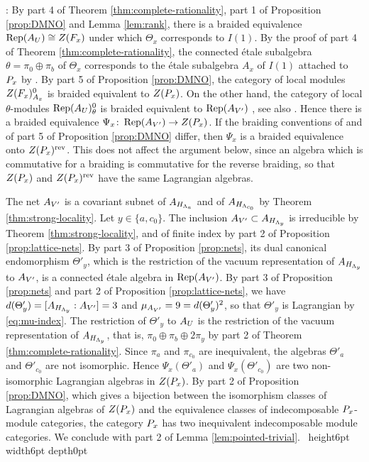 \documentclass[leqno]{article}
\let\cal\relax
\newcommand{\cal}{\mathcal}
\newcommand{\qed}{\hfill \vrule height6pt  width6pt depth0pt}
\newcommand{\co}{\colon}
\DeclareMathOperator{\Rep}{Rep} %
\newenvironment{proof}[1][]{\noindent {\it Proof #1} : }{\hbox{~}\qed
\smallskip
}
\numberwithin{equation}{section}
\begin{document}
\begin{proof}
By part 4 of Theorem \ref{thm:complete-rationality}, part 1 of Proposition \ref{prop:DMNO} and Lemma \ref{lem:rank}, there is a braided equivalence $\Rep(\cal A_U) \cong Z(\cal F_x)$ under which $\Theta_x$ corresponds to $I(1)$. By the proof of part 4 of Theorem \ref{thm:complete-rationality}, the connected \'etale subalgebra $\theta = \pi_0 \oplus \pi_b$ of $\Theta_x$ corresponds to the \'etale subalgebra $A_x$ of $I(1)$ attached to $\cal P_x$ by \cite[Theorem 4.10 p.~18]{DMNO13}. By part 5 of Proposition \ref{prop:DMNO}, the category of local modules $Z(\cal F_x)^0_{A_x}$ is braided equivalent to $Z(\cal P_x)$. On the other hand, the category of local $\theta$-modules $\Rep(\cal A_U)^0_\theta$ is braided equivalent to $\Rep(\cal A_{V'})$ \cite[Proposition 6.4 p.~33]{BKL15}, see also \cite[Theorem 3.1 p.~2]{Mug10}. Hence there is a braided equivalence $\Psi_x \co \Rep(\cal A_{V'}) \to Z(\cal P_x)$. If the braiding conventions of \cite[Proposition 6.4 p.~33]{BKL15} and of part 5 of Proposition \ref{prop:DMNO} differ, then $\Psi_x$ is a braided equivalence onto $Z(\cal P_x)^{\mathrm{rev}}$. This does not affect the argument below, since an algebra which is commutative for a braiding is commutative for the reverse braiding, so that $Z(\cal P_x)$ and $Z(\cal P_x)^{\mathrm{rev}}$ have the same Lagrangian algebras.

The net $\cal A_{V'}$ is a covariant subnet of $\cal A_{H_{\Lambda_a}}$ and of $\cal A_{H_{\Lambda_{c_0}}}$ by Theorem \ref{thm:strong-locality}. Let $y \in \{a,c_0\}$. The inclusion $\cal A_{V'} \subset \cal A_{H_{\Lambda_y}}$ is irreducible by Theorem \ref{thm:strong-locality}, and of finite index by part 2 of Proposition \ref{prop:lattice-nets}. By part 3 of Proposition \ref{prop:nets}, its dual canonical endomorphism $\Theta'_y$, which is the restriction of the vacuum representation of $\cal A_{H_{\Lambda_y}}$ to $\cal A_{V'}$, is a connected \'etale algebra in $\Rep(\cal A_{V'})$. By part 3 of Proposition \ref{prop:nets} and part 2 of Proposition \ref{prop:lattice-nets}, we have $d(\Theta'_y) = [\cal A_{H_{\Lambda_y}} : \cal A_{V'}] = 3$ and $\mu_{\cal A_{V'}} = 9 = d(\Theta'_y)^2$, so that $\Theta'_y$ is Lagrangian by \eqref{eq:mu-index}. The restriction of $\Theta'_y$ to $\cal A_U$ is the restriction of the vacuum representation of $\cal A_{H_{\Lambda_y}}$, that is, $\pi_0 \oplus \pi_b \oplus 2\pi_y$ by part 2 of Theorem \ref{thm:complete-rationality}. Since $\pi_a$ and $\pi_{c_0}$ are inequivalent, the algebras $\Theta'_a$ and $\Theta'_{c_0}$ are not isomorphic. Hence $\Psi_x(\Theta'_a)$ and $\Psi_x(\Theta'_{c_0})$ are two non-isomorphic Lagrangian algebras in $Z(\cal P_x)$. By part 2 of Proposition \ref{prop:DMNO}, which gives a bijection between the isomorphism classes of Lagrangian algebras of $Z(\cal P_x)$ and the equivalence classes of indecomposable $\cal P_x$-module categories, the category $\cal P_x$ has two inequivalent indecomposable module categories. We conclude with part 2 of Lemma \ref{lem:pointed-trivial}.
\end{proof}
\end{document}
